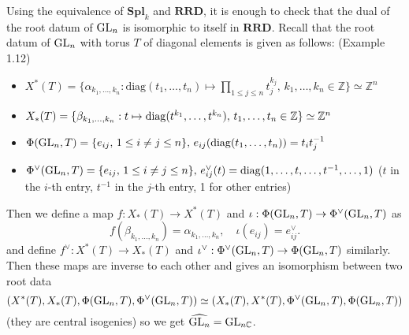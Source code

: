 \begin{problem}
Using the equivalence of $\mathbf{Spl}_{k}$ and $\mathbf{RRD}$, it is enough to check that the dual of the root datum
of $\operatorname{\mathrm{GL}}_{n}$ is isomorphic to itself in $\mathbf{RRD}$.
Recall that the root datum of $\operatorname{\mathrm{GL}}_{n}$ with torus $T$ of diagonal elements is given as follows: (Example 1.12)
\begin{itemize}
    \item $X^{*}(T) = \{
        \alpha_{k_1, \dots, k_{n}}: \mathrm{diag}(t_{1}, \dots, t_{n}) \mapsto \prod_{1\leq j \leq n}t_{j}^{k_{j}}, \, k_{1}, \dots, k_{n} \in \mathbb{Z}
    \}\simeq \mathbb{Z}^{n}$
    \item $X_{*}(T) = \{\beta_{k_{1}, \dots, k_{n}}:t \mapsto \operatorname{\mathrm{diag}}(t^{k_{1}}, \dots, t^{k_{n}}),\, t_{1}, \dots, t_{n} \in \mathbb{Z}\} \simeq \mathbb{Z}^{n}$
    \item $\Phi(\operatorname{\mathrm{GL}}_{n}, T) = \{e_{ij},\,1\leq i\neq j \leq n\},\,e_{ij}(\operatorname{\mathrm{diag}}(t_{1}, \dots, t_{n})) = t_{i}t_{j}^{-1}$
    \item $\Phi^{\vee}(\operatorname{\mathrm{GL}}_{n}, T) = \{e_{ij},\,1\leq i\neq j \leq n\},\,e_{ij}^{\vee}(t) = \operatorname{\mathrm{diag}}(1, \dots, t, \dots, t^{-1}, \dots, 1)$ ($t$ in the $i$-th entry, $t^{-1}$ in the $j$-th entry, 1 for other entries)
\end{itemize}
Then we define a map $f: X_{*}(T) \to X^{*}(T)$ and $\iota: \Phi(\operatorname{\mathrm{GL}}_{n}, T) \to \Phi^{\vee}(\operatorname{\mathrm{GL}}_{n}, T)$ as
$$
    f(\beta_{k_1, \dots, k_n}) = \alpha_{k_1, \dots, k_n}, \quad \iota(e_{ij}) = e_{ij}^{\vee}.
$$
and define $f^{\vee}: X^{*}(T) \to X_{*}(T)$ and $\iota^{\vee}: \Phi^{\vee}(\operatorname{\mathrm{GL}}_{n}, T) \to \Phi(\operatorname{\mathrm{GL}}_{n}, T)$ similarly.
Then these maps are inverse to each other and gives an isomorphism between two root data
$$
    (X^{*}(T), X_{*}(T), \Phi(\operatorname{\mathrm{GL}}_{n}, T), \Phi^{\vee}(\operatorname{\mathrm{GL}}_{n}, T)) \simeq (X_{*}(T), X^{*}(T), \Phi^{\vee}(\operatorname{\mathrm{GL}}_{n}, T), \Phi(\operatorname{\mathrm{GL}}_{n}, T))
$$
(they are central isogenies) so we get $\widehat{\operatorname{\mathrm{GL}}_{n}} = \operatorname{\mathrm{GL}}_{n\mathbb{C}}$.
\end{problem}

\begin{problem} \notfinish
\end{problem}

\begin{problem} \notfinish
\end{problem}
